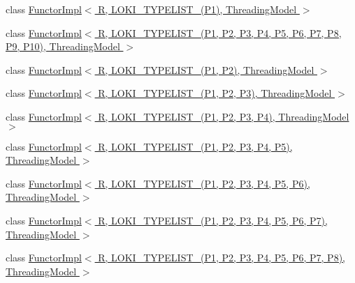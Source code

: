 \begin{DoxyCompactItemize}
\item 
class \hyperlink{classLoki_1_1FunctorImpl_3_01R_00_01LOKI__TYPELIST__1_07P1_08_00_01ThreadingModel_01_4}{Functor\+Impl$<$ R, L\+O\+K\+I\+\_\+\+T\+Y\+P\+E\+L\+I\+S\+T\+\_(\+P1), Threading\+Model $>$}
\item 
class \hyperlink{classLoki_1_1FunctorImpl_3_01R_00_01LOKI__TYPELIST__10_07P1_00_01P2_00_01P3_00_01P4_00_01P5_00_0411efd7e1763d854e78c97db5e851b87}{Functor\+Impl$<$ R, L\+O\+K\+I\+\_\+\+T\+Y\+P\+E\+L\+I\+S\+T\+\_(\+P1, P2, P3, P4, P5, P6, P7, P8, P9, P10),                                                                           Threading\+Model $>$}
\item 
class \hyperlink{classLoki_1_1FunctorImpl_3_01R_00_01LOKI__TYPELIST__2_07P1_00_01P2_08_00_01ThreadingModel_01_4}{Functor\+Impl$<$ R, L\+O\+K\+I\+\_\+\+T\+Y\+P\+E\+L\+I\+S\+T\+\_(\+P1, P2), Threading\+Model $>$}
\item 
class \hyperlink{classLoki_1_1FunctorImpl_3_01R_00_01LOKI__TYPELIST__3_07P1_00_01P2_00_01P3_08_00_01ThreadingModel_01_4}{Functor\+Impl$<$ R, L\+O\+K\+I\+\_\+\+T\+Y\+P\+E\+L\+I\+S\+T\+\_(\+P1, P2, P3), Threading\+Model $>$}
\item 
class \hyperlink{classLoki_1_1FunctorImpl_3_01R_00_01LOKI__TYPELIST__4_07P1_00_01P2_00_01P3_00_01P4_08_00_01ThreadingModel_01_4}{Functor\+Impl$<$ R, L\+O\+K\+I\+\_\+\+T\+Y\+P\+E\+L\+I\+S\+T\+\_(\+P1, P2, P3, P4), Threading\+Model $>$}
\item 
class \hyperlink{classLoki_1_1FunctorImpl_3_01R_00_01LOKI__TYPELIST__5_07P1_00_01P2_00_01P3_00_01P4_00_01P5_08_00_01ThreadingModel_01_4}{Functor\+Impl$<$ R, L\+O\+K\+I\+\_\+\+T\+Y\+P\+E\+L\+I\+S\+T\+\_(\+P1, P2, P3, P4, P5), Threading\+Model $>$}
\item 
class \hyperlink{classLoki_1_1FunctorImpl_3_01R_00_01LOKI__TYPELIST__6_07P1_00_01P2_00_01P3_00_01P4_00_01P5_00_01P6_08_00_01ThreadingModel_01_4}{Functor\+Impl$<$ R, L\+O\+K\+I\+\_\+\+T\+Y\+P\+E\+L\+I\+S\+T\+\_(\+P1, P2, P3, P4, P5, P6), Threading\+Model $>$}
\item 
class \hyperlink{classLoki_1_1FunctorImpl_3_01R_00_01LOKI__TYPELIST__7_07P1_00_01P2_00_01P3_00_01P4_00_01P5_00_01b06f56baa72992ebef0383deced9a1f5}{Functor\+Impl$<$ R, L\+O\+K\+I\+\_\+\+T\+Y\+P\+E\+L\+I\+S\+T\+\_(\+P1, P2, P3, P4, P5, P6, P7), Threading\+Model $>$}
\item 
class \hyperlink{classLoki_1_1FunctorImpl_3_01R_00_01LOKI__TYPELIST__8_07P1_00_01P2_00_01P3_00_01P4_00_01P5_00_0107a4feb1ead61f16d15a34e72c5289f3}{Functor\+Impl$<$ R, L\+O\+K\+I\+\_\+\+T\+Y\+P\+E\+L\+I\+S\+T\+\_(\+P1, P2, P3, P4, P5, P6, P7, P8),                                                                           Threading\+Model $>$}

\end{DoxyCompactItemize}
